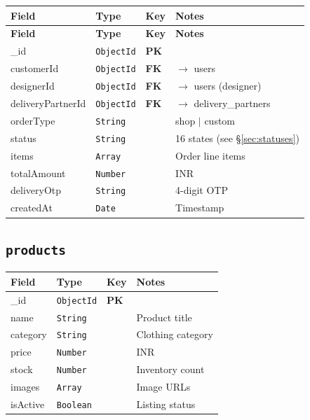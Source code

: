 \documentclass[a4paper,11pt]{article}
\newcommand{\pk}{\textcolor{success}{\textbf{PK}}}
\newcommand{\fk}{\textcolor{warning}{\textbf{FK}}}
\newcommand{\coll}[1]{\textcolor{primary}{\texttt{\textbf{#1}}}}
\newcommand{\dtype}[1]{\textcolor{secondary}{\texttt{#1}}}
\begin{document}
\begin{longtable}{@{}L{3.8cm}L{2.8cm}C{1.5cm}L{4.9cm}@{}}
\toprule
{}
\textbf{Field} & \textbf{Type} & \textbf{Key} & \textbf{Notes} \\
\midrule
\endfirsthead
\toprule
{}
\textbf{Field} & \textbf{Type} & \textbf{Key} & \textbf{Notes} \\
\midrule
\endhead
\bottomrule
\endlastfoot
\_id                & \dtype{ObjectId} & \pk & \\
customerId          & \dtype{ObjectId} & \fk & $\to$ users \\
designerId          & \dtype{ObjectId} & \fk & $\to$ users (designer) \\
deliveryPartnerId   & \dtype{ObjectId} & \fk & $\to$ delivery\_partners \\
orderType           & \dtype{String}   &     & shop $|$ custom \\
status              & \dtype{String}   &     & 16 states (see \S\ref{sec:statuses}) \\
items               & \dtype{Array}    &     & Order line items \\
totalAmount         & \dtype{Number}   &     & INR \\
deliveryOtp         & \dtype{String}   &     & 4-digit OTP \\
createdAt           & \dtype{Date}     &     & Timestamp \\
\end{longtable}

\subsection{\coll{products}}

\begin{tabular}{@{}L{3.2cm}L{2.8cm}C{1.5cm}L{5.5cm}@{}}
\toprule
{}
\textbf{Field} & \textbf{Type} & \textbf{Key} & \textbf{Notes} \\
\midrule
\_id      & \dtype{ObjectId} & \pk & \\
name      & \dtype{String}   &     & Product title \\
category  & \dtype{String}   &     & Clothing category \\
price     & \dtype{Number}   &     & INR \\
stock     & \dtype{Number}   &     & Inventory count \\
images    & \dtype{Array}    &     & Image URLs \\
isActive  & \dtype{Boolean}  &     & Listing status \\
\bottomrule
\end{tabular}
\end{document}
